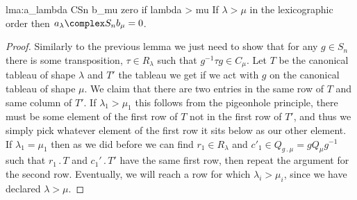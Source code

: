 \documentclass[fleqn]{NotesClass}
\newcommand{\action}{\mathbin{.}}
\newcommand{\rowGroup}{R}
\newcommand{\columnGroup}{C}
\begin{document}
    \begin{lma}{}{lma:a_lambda CSn b_mu zero if lambda > mu}
        If \(\lambda > \mu\) in the lexicographic order then \(a_\lambda \complex S_n b_\mu = 0\).
        \begin{proof}
            Similarly to the previous lemma we just need to show that for any \(g \in S_n\) there is some transposition, \(\tau \in \rowGroup_\lambda\) such that \(g^{-1}\tau g \in \columnGroup_\mu\).
            Let \(T\) be the canonical tableau of shape \(\lambda\) and \(T'\) the tableau we get if we act with \(g\) on the canonical tableau of shape \(\mu\).
            We claim that there are two entries in the same row of \(T\) and same column of \(T'\).
            If \(\lambda_1 > \mu_1\) this follows from the pigeonhole principle, there must be some element of the first row of \(T\) not in the first row of \(T'\), and thus we simply pick whatever element of the first row it sits below as our other element.
            If \(\lambda_1 = \mu_1\) then as we did before we can find \(r_1 \in \rowGroup_\lambda\) and \(c'_1 \in Q_{g \action \mu} = gQ_\mu g^{-1}\) such that \(r_1 \action T\) and \(c_1' \action T'\) have the same first row, then repeat the argument for the second row.
            Eventually, we will reach a row for which \(\lambda_i > \mu_i\), since we have declared \(\lambda > \mu\).
        \end{proof}
    \end{lma}
    
\end{document}
